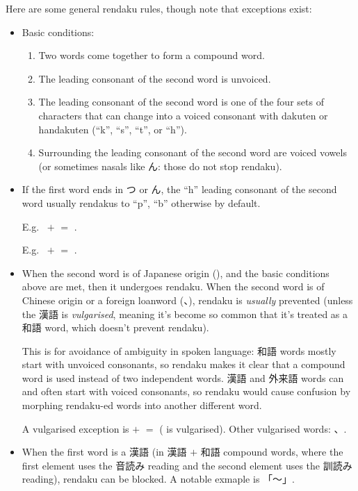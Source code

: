 \documentclass[../nihongo-gakushuu-kyouzai.tex]{subfiles}
\begin{document}
Here are some general rendaku rules, though note that exceptions exist:
\begin{itemize}
    \item Basic conditions:
    \begin{enumerate}
        \item Two words come together to form a compound word.
        \item The leading consonant of the second word is unvoiced.
        \item The leading consonant of the second word is one of the four sets of characters that can change into a voiced consonant with dakuten or handakuten (``k'', ``s'', ``t'', or ``h'').
        \item Surrounding the leading consonant of the second word are voiced vowels (or sometimes nasals like ん: those do not stop rendaku).
    \end{enumerate}
    \item If the first word ends in つ or ん, the ``h'' leading consonant of the second word usually rendakus to ``p'', ``b'' otherwise by default.

    E.g.\  $+$  $=$ .

    E.g.\  $+$  $=$ .
    \item When the second word is of Japanese origin (), and the basic conditions above are met, then it undergoes rendaku. When the second word is of Chinese origin or a foreign loanword (、), rendaku is \emph{usually} prevented (unless the 漢語 is \emph{vulgarised}, meaning it's become so common that it's treated as a 和語 word, which doesn't prevent rendaku).

    This is for avoidance of ambiguity in spoken language: 和語 words mostly start with unvoiced consonants, so rendaku makes it clear that a compound word is used instead of two independent words. 漢語 and 外来語 words can and often start with voiced consonants, so rendaku would cause confusion by morphing rendaku-ed words into another different word.

    A vulgarised exception is  $+$  $=$  ( is vulgarised). Other vulgarised words: 、.

    \item When the first word is a 漢語 (in 漢語 $+$ 和語 compound words, where the first element uses the 音読み reading and the second element uses the 訓読み reading), rendaku can be blocked. A notable exmaple is 「〜」.


\end{itemize}
\end{document}
